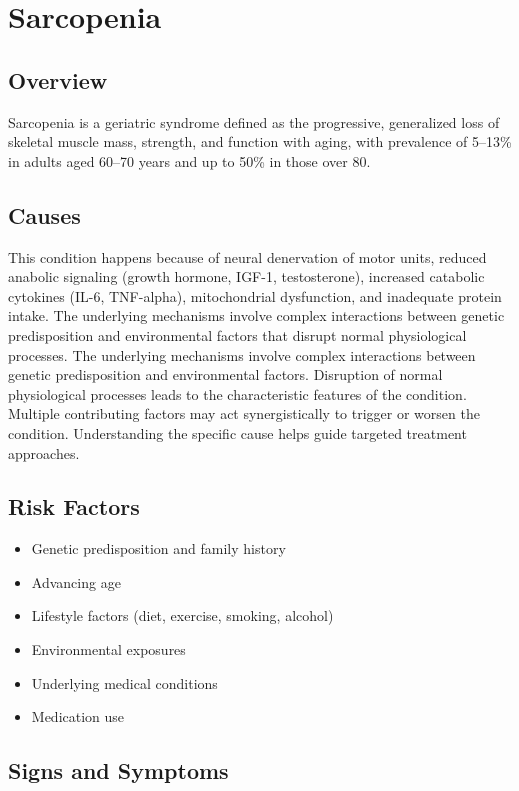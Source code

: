 \chapter{Sarcopenia}
\label{sec:Sarcopenia}

\section{Overview}
Sarcopenia is a geriatric syndrome defined as the progressive, generalized loss of skeletal muscle mass, strength, and function with aging, with prevalence of 5--13\% in adults aged 60--70 years and up to 50\% in those over 80.
\section{Causes}
This condition happens because of neural denervation of motor units, reduced anabolic signaling (growth hormone, IGF-1, testosterone), increased catabolic cytokines (IL-6, TNF-alpha), mitochondrial dysfunction, and inadequate protein intake. The underlying mechanisms involve complex interactions between genetic predisposition and environmental factors that disrupt normal physiological processes. The underlying mechanisms involve complex interactions between genetic predisposition and environmental factors. Disruption of normal physiological processes leads to the characteristic features of the condition. Multiple contributing factors may act synergistically to trigger or worsen the condition. Understanding the specific cause helps guide targeted treatment approaches.
\section{Risk Factors}


\begin{itemize}[noitemsep]
  \item Genetic predisposition and family history
  \item Advancing age
  \item Lifestyle factors (diet, exercise, smoking, alcohol)
  \item Environmental exposures
  \item Underlying medical conditions
  \item Medication use
\end{itemize}
\section{Signs and Symptoms}

